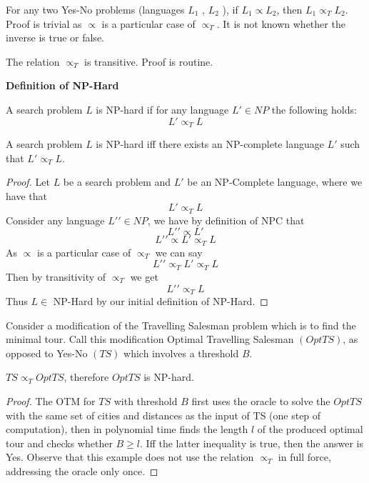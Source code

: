 \begin{theorem}
    For any two Yes-No problems (languages $L_1$ , $L_2$ ),
    if $L_1 \propto L_2$,
    then $L_1 \propto_T L_2$.
    Proof is trivial as $\propto$ is a particular case of $\propto_T$.
    It is not known whether the inverse is true or false.
\end{theorem}

\begin{theorem}
    The relation $\propto_T$ is transitive.
    Proof is routine.
\end{theorem}

\textbf{Definition of NP-Hard}
\begin{definition}
    A search problem $L$ is NP-hard if for any language
    $L\prime \in NP$ the following holds:
    $$L\prime \propto_T L$$
\end{definition}
\begin{theorem}
    A search problem $L$ is NP-hard iff
    there exists an NP-complete language $L\prime$ such that
    $L\prime \propto_T L$.
\end{theorem}
\begin{proof}
    Let $L$ be a search problem and $L\prime$ be an NP-Complete language,
    where we have that
    $$L\prime \propto_T L$$
    Consider any language $L\prime\prime \in NP$,
    we have by definition of NPC that
    $$L\prime\prime \propto L\prime$$
    $$L\prime\prime \propto L\prime \propto_T L$$
    As $\propto$ is a particular case of $\propto_T$ we can say
    $$L\prime\prime \propto_T L\prime \propto_T L$$
    Then by transitivity of $\propto_T$ we get
    $$L\prime\prime \propto_T L$$
    Thus $L \in$ NP-Hard by our initial definition of NP-Hard.
\end{proof}

Consider a modification of the Travelling Salesman problem
which is to find the minimal tour.
Call this modification Optimal Travelling Salesman $(OptTS)$,
as opposed to Yes-No $(TS)$ which involves a threshold $B$.

\begin{theorem}
    $TS \propto_T OptTS$, therefore $OptTS$ is NP-hard.
\end{theorem}

\begin{proof}
    The OTM for $TS$ with threshold $B$ first uses the oracle
    to solve the $OptTS$ with the same set of cities and distances as the input of TS
    (one step of computation),
    then in polynomial time finds the length $l$ of the produced optimal tour
    and checks whether $B \geq l$.
    Iff the latter inequality is true, then the answer is Yes.
    Observe that this example does not use the relation $\propto_T$ in full force, addressing the oracle only once.
\end{proof}
